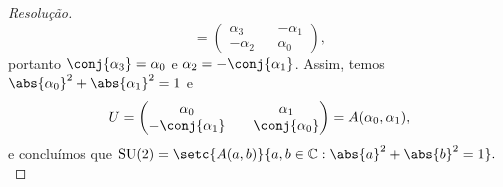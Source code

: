 \begin{proof}[Resolução]
\begin{equation*}
        =
        \begin{pmatrix}
            \alpha_3 && -\alpha_1\\
            -\alpha_2 && \alpha_0
        \end{pmatrix},
    \end{equation*}
    portanto \(\conj{\alpha_3} = \alpha_0\) e \(\alpha_2 = -\conj{\alpha_1}\). Assim, temos \(\abs{\alpha_0}^2 + \abs{\alpha_1}^2 = 1\) e
    \begin{equation*}
        U = \begin{pmatrix}
            \alpha_0 && \alpha_1\\
            -\conj{\alpha_1} && \conj{\alpha_0}
        \end{pmatrix} = A(\alpha_0, \alpha_1),
    \end{equation*}
    e concluímos que \(\mathrm{SU}(2) =\setc{A(a,b)}{a,b\in \mathbb{C} : \abs{a}^2 + \abs{b}^2 = 1}. \)


\end{proof}
